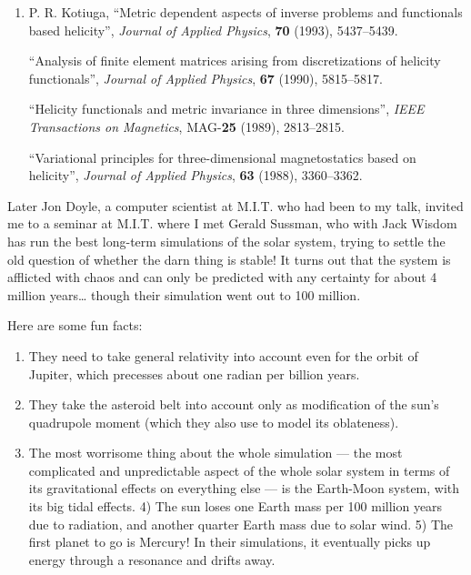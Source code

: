 \documentclass{article}
\def\tightlist{}
\begin{document}
\begin{enumerate}
\def\labelenumi{\arabic{enumi})}
\setcounter{enumi}{2}
\item
  P. R. Kotiuga, ``Metric dependent aspects of inverse problems and
  functionals based helicity'', \emph{Journal of Applied Physics},
  \textbf{70} (1993), 5437--5439.

  ``Analysis of finite element matrices arising from discretizations of
  helicity functionals'', \emph{Journal of Applied Physics}, \textbf{67}
  (1990), 5815--5817.

  ``Helicity functionals and metric invariance in three dimensions'',
  \emph{IEEE Transactions on Magnetics}, MAG-\textbf{25} (1989),
  2813--2815.

  ``Variational principles for three-dimensional magnetostatics based on
  helicity'', \emph{Journal of Applied Physics}, \textbf{63} (1988),
  3360--3362.
\end{enumerate}

Later Jon Doyle, a computer scientist at M.I.T. who had been to my talk,
invited me to a seminar at M.I.T. where I met Gerald Sussman, who with
Jack Wisdom has run the best long-term simulations of the solar system,
trying to settle the old question of whether the darn thing is stable!
It turns out that the system is afflicted with chaos and can only be
predicted with any certainty for about 4 million years\ldots{} though
their simulation went out to 100 million.

Here are some fun facts:

\begin{enumerate}
\def\labelenumi{\arabic{enumi})}
\tightlist
\item
  They need to take general relativity into account even for the orbit
  of Jupiter, which precesses about one radian per billion years.
\item
  They take the asteroid belt into account only as modification of the
  sun's quadrupole moment (which they also use to model its oblateness).
\item
  The most worrisome thing about the whole simulation --- the most
  complicated and unpredictable aspect of the whole solar system in
  terms of its gravitational effects on everything else --- is the
  Earth-Moon system, with its big tidal effects. 4) The sun loses one
  Earth mass per 100 million years due to radiation, and another quarter
  Earth mass due to solar wind. 5) The first planet to go is Mercury! In
  their simulations, it eventually picks up energy through a resonance
  and drifts away.
\end{enumerate}
\end{document}
